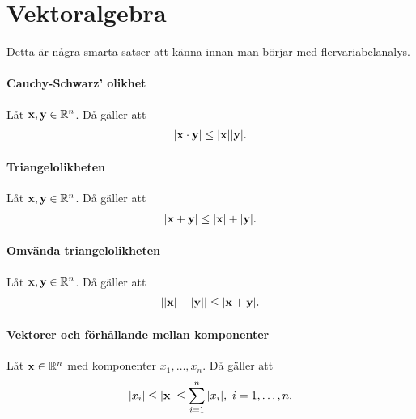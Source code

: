 \section{Vektoralgebra}
Detta är några smarta satser att känna innan man börjar med flervariabelanalys.

\paragraph{Cauchy-Schwarz' olikhet}
Låt $\vect{x},\vect{y}\in\R^n$. Då gäller att
\begin{align*}
	\abs{\vect{x}\cdot\vect{y}}\leq\abs{\vect{x}}\abs{\vect{y}}.
\end{align*}

\proof

\paragraph{Triangelolikheten}
Låt $\vect{x},\vect{y}\in\R^n$. Då gäller att
\begin{align*}
	\abs{\vect{x} + \vect{y}}\leq\abs{\vect{x}} + \abs{\vect{y}}.
\end{align*}

\proof

\paragraph{Omvända triangelolikheten}
Låt $\vect{x},\vect{y}\in\R^n$. Då gäller att
\begin{align*}
	\abs{\abs{\vect{x}} - \abs{\vect{y}}}\leq\abs{\vect{x} + \vect{y}}.
\end{align*}

\proof

\paragraph{Vektorer och förhållande mellan komponenter}
Låt $\vect{x}\in\R^n$ med komponenter $x_1, \dots, x_n$. Då gäller att
\begin{align*}
	\abs{x_i}\leq\abs{\vect{x}}\leq\sum\limits_{i = 1}^{n}\abs{x_i},\ i = 1, \dots, n.
\end{align*}

\proof